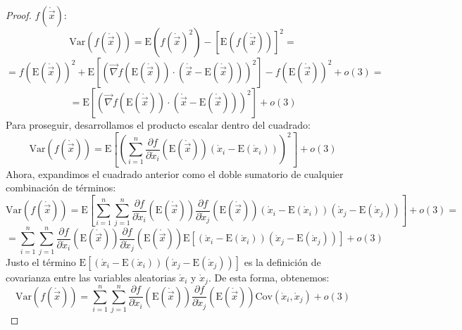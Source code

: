\documentclass[11pt,a4paper,spanish]{article}
\numberwithin{equation}{section}
\numberwithin{table}{section}
\numberwithin{figure}{section}
\theoremstyle{definition}
\theoremstyle{remark}
\theoremstyle{definition}
\theoremstyle{remark}
\theoremstyle{plain}
\theoremstyle{plain}
\theoremstyle{plain}
\theoremstyle{plain}
\theoremstyle{plain}
\theoremstyle{plain}
\begin{document}
\begin{proof}
		$f\left(\mathring{\vec{x}}\right)$:
		\[
		\mathrm{Var}\left(f\left(\mathring{\vec{x}}\right)\right)=\mathrm{E}\left(f\left(\mathring{\vec{x}}\right)^{2}\right)-\left[\mathrm{E}\left(f\left(\mathring{\vec{x}}\right)\right)\right]^{2}=
		\]
		\[
		=f\left(\mathrm{E}\left(\mathring{\vec{x}}\right)\right)^{2}+\mathrm{E}\left[\left(\vec{\nabla}f\left(\mathrm{E}\left(\mathring{\vec{x}}\right)\right)\cdot\left(\mathring{\vec{x}}-\mathrm{E}\left(\mathring{\vec{x}}\right)\right)\right)^{2}\right]-f\left(\mathrm{E}\left(\mathring{\vec{x}}\right)\right)^{2}+o\left(3\right)=
		\]
		\[
		=\mathrm{E}\left[\left(\vec{\nabla}f\left(\mathrm{E}\left(\mathring{\vec{x}}\right)\right)\cdot\left(\mathring{\vec{x}}-\mathrm{E}\left(\mathring{\vec{x}}\right)\right)\right)^{2}\right]+o\left(3\right)
		\]
		Para proseguir, desarrollamos el producto escalar dentro del cuadrado:
		\[
		\mathrm{Var}\left(f\left(\mathring{\vec{x}}\right)\right)=\mathrm{E}\left[\left(\sum_{i=1}^{n}\frac{\partial f}{\partial\dot{x}_{i}}\left(\mathrm{E}\left(\mathring{\vec{x}}\right)\right)\left(\mathring{x}_{i}-\mathrm{E}\left(\mathring{x}_{i}\right)\right)\right)^{2}\right]+o\left(3\right)
		\]
		Ahora, expandimos el cuadrado anterior como el doble sumatorio de
		cualquier combinación de términos:
		\[
		\mathrm{Var}\left(f\left(\mathring{\vec{x}}\right)\right)=\mathrm{E}\left[\sum_{i=1}^{n}\sum_{j=1}^{n}\frac{\partial f}{\partial\dot{x}_{i}}\left(\mathrm{E}\left(\mathring{\vec{x}}\right)\right)\frac{\partial f}{\partial\dot{x}_{j}}\left(\mathrm{E}\left(\mathring{\vec{x}}\right)\right)\left(\mathring{x}_{i}-\mathrm{E}\left(\mathring{x}_{i}\right)\right)\left(\mathring{x}_{j}-\mathrm{E}\left(\mathring{x}_{j}\right)\right)\right]+o\left(3\right)=
		\]
		\[
		=\sum_{i=1}^{n}\sum_{j=1}^{n}\frac{\partial f}{\partial\dot{x}_{i}}\left(\mathrm{E}\left(\mathring{\vec{x}}\right)\right)\frac{\partial f}{\partial\dot{x}_{j}}\left(\mathrm{E}\left(\mathring{\vec{x}}\right)\right)\mathrm{E}\left[\left(\mathring{x}_{i}-\mathrm{E}\left(\mathring{x}_{i}\right)\right)\left(\mathring{x}_{j}-\mathrm{E}\left(\mathring{x}_{j}\right)\right)\right]+o\left(3\right)
		\]
		Justo el término $\mathrm{E}\left[\left(\mathring{x}_{i}-\mathrm{E}\left(\mathring{x}_{i}\right)\right)\left(\mathring{x}_{j}-\mathrm{E}\left(\mathring{x}_{j}\right)\right)\right]$
		es la definición de covarianza entre las variables aleatorias $\mathring{x}_{i}$
		y $\mathring{x}_{j}$. De esta forma, obtenemos:
		\[
		\mathrm{Var}\left(f\left(\mathring{\vec{x}}\right)\right)=\sum_{i=1}^{n}\sum_{j=1}^{n}\frac{\partial f}{\partial\dot{x}_{i}}\left(\mathrm{E}\left(\mathring{\vec{x}}\right)\right)\frac{\partial f}{\partial\dot{x}_{j}}\left(\mathrm{E}\left(\mathring{\vec{x}}\right)\right)\mathrm{Cov}\left(\mathring{x}_{i},\mathring{x}_{j}\right)+o\left(3\right)
\]
\end{proof}
\end{document}
